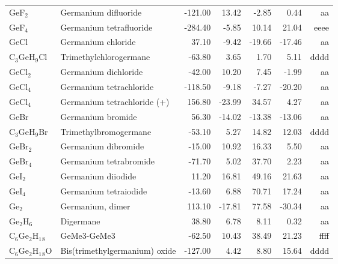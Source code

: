 \begin{table}
\begin{center}
\begin{tabular}{llrrrrr}
 GeF$_2$        & Germanium difluoride                   &  -121.00    &    13.42  &    -2.85  &     0.44  &     aa\\
 GeF$_4$        & Germanium tetrafluoride                &  -284.40    &    -5.85  &    10.14  &    21.04  &   eeee\\
 GeCl        & Germanium chloride                     &    37.10    &    -9.42  &   -19.66  &   -17.46  &     aa\\
 C$_3$GeH$_9$Cl    & Trimethylchlorogermane                 &   -63.80    &     3.65  &     1.70  &     5.11  &   dddd\\
 GeCl$_2$       & Germanium dichloride                   &   -42.00    &    10.20  &     7.45  &    -1.99  &     aa\\
 GeCl$_4$       & Germanium tetrachloride                &  -118.50    &    -9.18  &    -7.27  &   -20.20  &     aa\\
 GeCl$_4$       & Germanium tetrachloride (+)            &   156.80    &   -23.99  &    34.57  &     4.27  &     aa\\
 GeBr        & Germanium bromide                      &    56.30    &   -14.02  &   -13.38  &   -13.06  &     aa\\
 C$_3$GeH$_9$Br    & Trimethylbromogermane                  &   -53.10    &     5.27  &    14.82  &    12.03  &   dddd\\
 GeBr$_2$       & Germanium dibromide                    &   -15.00    &    10.92  &    16.33  &     5.50  &     aa\\
 GeBr$_4$       & Germanium tetrabromide                 &   -71.70    &     5.02  &    37.70  &     2.23  &     aa\\
 GeI$_2$        & Germanium diiodide                     &    11.20    &    16.81  &    49.16  &    21.63  &     aa\\
 GeI$_4$        & Germanium tetraiodide                  &   -13.60    &     6.88  &    70.71  &    17.24  &     aa\\
 Ge$_2$         & Germanium, dimer                       &   113.10    &   -17.81  &    77.58  &   -30.34  &     aa\\
 Ge$_2$H$_6$       & Digermane                              &    38.80    &     6.78  &     8.11  &     0.32  &     aa\\
 C$_6$Ge$_2$H$_1$$_8$    & GeMe3-GeMe3                            &   -62.50    &    10.43  &    38.49  &    21.23  &   ffff\\
 C$_6$Ge$_2$H$_1$$_8$O   & Bis(trimethylgermanium) oxide          &  -127.00    &     4.42  &     8.80  &    15.64  &   dddd\\

\end{tabular}
\end{center}
\end{table}
